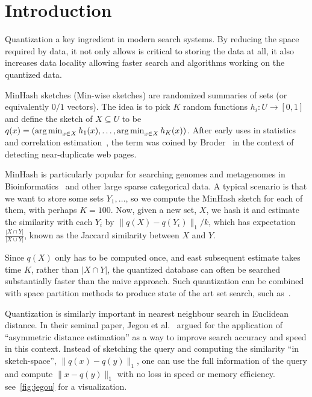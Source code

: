 
\section{Introduction}
Quantization a key ingredient in modern search systems.
By reducing the space required by data, it not only allows is critical to storing the data at all, it also increases data locality allowing faster search and algorithms working on the quantized data.

MinHash sketches (Min-wise sketches) are randomized summaries of sets (or equivalently $0/1$ vectors).
The idea is to pick $K$ random functions $h_i : U \to [0,1]$ and define the sketch of $X\subseteq U$ to be
$q(x) = (\operatorname*{arg\,min}_{x\in X}h_1(x), \dots, \operatorname*{arg\,min}_{x\in X}h_K(x))$.
After early uses in statistics~\cite{brewer1972selecting} and correlation estimation~\cite{flajolet1985probabilistic}, the term was coined by Broder~\cite{broder1997resemblance} in the context of detecting near-duplicate web pages.

MinHash is particularly popular for searching genomes and metagenomes in Bioinformatics~\cite{ondov2016mash} and other large sparse categorical data.
A typical scenario is that we want to store some sets $Y_1, \dots$, so we compute the MinHash sketch for each of them, with perhaps $K=100$.
Now, given a new set, $X$, we hash it and estimate the similarity with each $Y_i$ by $\|q(X)-q(Y_i)\|_1/k$, which has expectation $\frac{|X\cap Y|}{|X\cup Y|}$, known as the Jaccard similarity between $X$ and $Y$.

Since $q(X)$ only has to be computed once, and east subsequent estimate takes time $K$, rather than $|X \cap Y|$, the quantized database can often be searched substantially faster than the naive approach.
Such quantization can be combined with space partition methods to produce state of the art set search, such as~\cite{christiani2018scalable}.

Quantization is similarly important in nearest neighbour search in Euclidean distance.
In their seminal paper, Jegou et al.~\cite{jegou2010product}
argued for the application of ``asymmetric distance estimation'' as a way to improve search accuracy and speed in this context.
Instead of sketching the query and computing the similarity ``in sketch-space'', $\|q(x)-q(y)\|_1$,
one can use the full information of the query and compute $\|x-q(y)\|_1$ with no loss in speed or memory efficiency.
see~\cref{fig:jegou} for a visualization.


